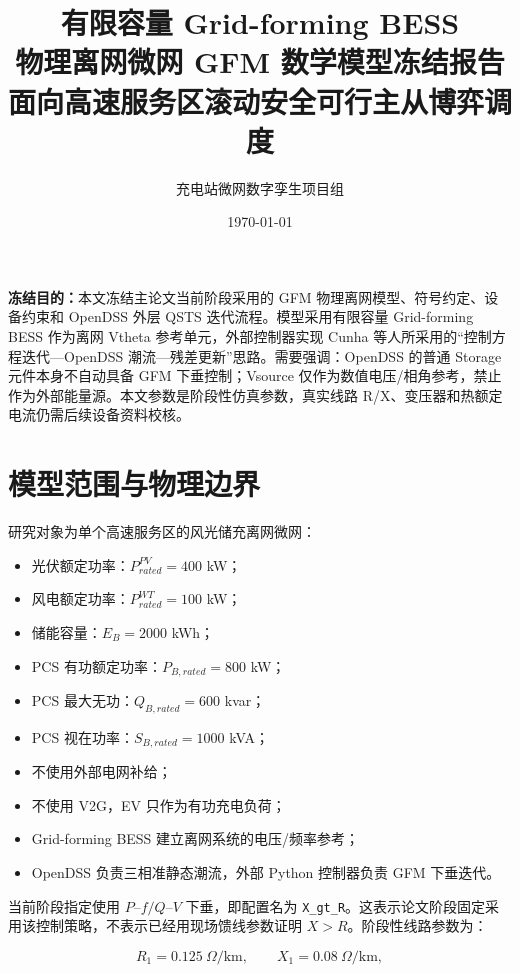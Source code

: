 \documentclass[UTF8,a4paper,11pt]{ctexart}
\title{\vspace{-1.4cm}\textbf{\color{mainblue}有限容量 Grid-forming BESS\\物理离网微网 GFM 数学模型冻结报告}\\[6pt]
\large 面向高速服务区滚动安全可行主从博弈调度}
\author{充电站微网数字孪生项目组}
\date{\today}
\begin{document}
\sloppy
\maketitle
\thispagestyle{fancy}

\begin{center}
\begin{minipage}{0.93\textwidth}\small
\textbf{冻结目的：}本文冻结主论文当前阶段采用的 GFM 物理离网模型、符号约定、设备约束和 OpenDSS 外层 QSTS 迭代流程。模型采用有限容量 Grid-forming BESS 作为离网 Vtheta 参考单元，外部控制器实现 Cunha 等人所采用的“控制方程迭代—OpenDSS 潮流—残差更新”思路。需要强调：OpenDSS 的普通 Storage 元件本身不自动具备 GFM 下垂控制；Vsource 仅作为数值电压/相角参考，禁止作为外部能量源。本文参数是阶段性仿真参数，真实线路 R/X、变压器和热额定电流仍需后续设备资料校核。
\end{minipage}
\end{center}

\section{模型范围与物理边界}

研究对象为单个高速服务区的风光储充离网微网：

\begin{itemize}
  \item 光伏额定功率：$P^{PV}_{rated}=400$ kW；
  \item 风电额定功率：$P^{WT}_{rated}=100$ kW；
  \item 储能容量：$E_B=2000$ kWh；
  \item PCS 有功额定功率：$P_{B,rated}=800$ kW；
  \item PCS 最大无功：$Q_{B,rated}=600$ kvar；
  \item PCS 视在功率：$S_{B,rated}=1000$ kVA；
  \item 不使用外部电网补给；
  \item 不使用 V2G，EV 只作为有功充电负荷；
  \item Grid-forming BESS 建立离网系统的电压/频率参考；
  \item OpenDSS 负责三相准静态潮流，外部 Python 控制器负责 GFM 下垂迭代。
\end{itemize}

当前阶段指定使用 $P$--$f/Q$--$V$ 下垂，即配置名为 \texttt{X\_gt\_R}。这表示论文阶段固定采用该控制策略，不表示已经用现场馈线参数证明 $X>R$。阶段性线路参数为：

\begin{equation}
R_1=0.125\ \Omega/\text{km},\qquad X_1=0.08\ \Omega/\text{km},
\end{equation}
\end{document}
